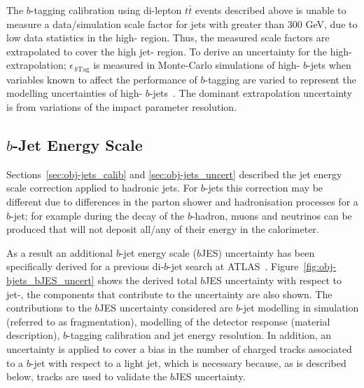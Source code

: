 The $b$-tagging calibration using di-lepton $t\bar{t}$ events described above
is unable to measure a data/simulation scale factor for jets with \pT{} greater than 300 GeV, due to low data statistics in the high-\pT{} region.
Thus, the measured scale factors are extrapolated to cover the high jet-\pT{} region.
To derive an uncertainty for the high-\pT{} extrapolation; $\epsilon_{\,b\text{Tag}}$ is measured in Monte-Carlo simulations of high-\pT{} $b$-jets  
when variables known to affect the performance of $b$-tagging are varied to represent the modelling uncertainties of high-\pT{} $b$-jets~\cite{obj-bjets_calib_highPt}.
The dominant extrapolation uncertainty is from variations of the impact parameter resolution.

\subsection{$b$-Jet Energy Scale}
\label{sec:obj-bjets_bjes}

Sections~\ref{sec:obj-jets_calib} and \ref{sec:obj-jets_uncert} described the
jet energy scale correction applied to hadronic jets.
For $b$-jets this correction may be different due to differences in the parton shower and hadronisation processes for a $b$-jet;
for example during the decay of the $b$-hadron, muons and neutrinos can be produced that will not deposit all/any of their energy in the calorimeter.

As a result an additional $b$-jet energy scale ($b$JES) uncertainty has been 
specifically derived for a previous di-$b$-jet search at ATLAS~\cite{dibjet-mori16_paper}.
Figure~\ref{fig:obj-bjets_bJES_uncert} shows the derived total $b$JES uncertainty with respect to jet-\pT{},
the components that contribute to the uncertainty are also shown.
The contributions to the $b$JES uncertainty considered are $b$-jet modelling in simulation (referred to as fragmentation),
modelling of the detector response (material description), $b$-tagging calibration and jet energy resolution.
In addition, an uncertainty is applied to cover a bias in the number of charged tracks associated to a $b$-jet with respect to a light jet,
which is necessary because, as is described below, tracks are used to validate the $b$JES uncertainty.

